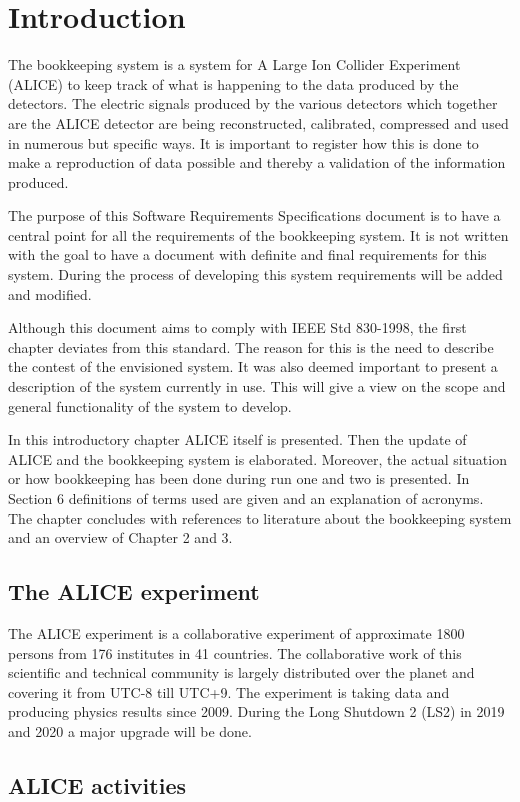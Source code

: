 \chapter{Introduction}
The bookkeeping system is a system for A Large Ion Collider Experiment (ALICE) to keep track of what is happening to the data produced by the detectors. The electric signals produced by the various detectors which together are the ALICE detector are being reconstructed, calibrated, compressed and used in numerous but specific ways. It is important to register how this is done to make a reproduction of data possible and thereby a validation of the information produced.

The purpose of this Software Requirements Specifications document is to have a central point for all the requirements of the bookkeeping system. It is not written with the goal to have a document with definite and final requirements for this system. During the process of developing this system requirements will be added and modified.

Although this document aims to comply with IEEE Std 830-1998, the first chapter deviates from this standard. The reason for this is the need to describe the contest of the envisioned system. It was also deemed important to present a description of the system currently in use. This will give a view on the scope and general functionality of the system to develop.

In this introductory chapter ALICE itself is presented. Then the update of ALICE and the bookkeeping system is elaborated. Moreover, the actual situation or how bookkeeping has been done during run one and two is presented. In Section 6 definitions of terms used are given and an explanation of acronyms. The chapter concludes with references to literature about the bookkeeping system and an overview of Chapter 2 and 3.

\section{The ALICE experiment}
The ALICE experiment is a collaborative experiment of approximate 1800 persons from 176 institutes in 41 countries. The collaborative work of this scientific and technical community is largely distributed over the planet and covering it from UTC-8 till UTC+9. The experiment is taking data and producing physics results since 2009. During the Long Shutdown 2 (LS2) in 2019 and 2020 a major upgrade will be done. 

\section{ALICE activities}


